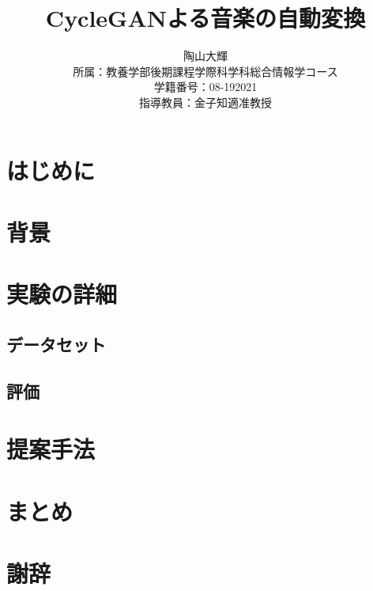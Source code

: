 \documentclass[dvipdfmx]{jreport}
\title{CycleGANよる音楽の自動変換}
\author{陶山大輝 \\
所属：教養学部後期課程学際科学科総合情報学コース\\
学籍番号：08-192021\\
指導教員：金子知適准教授\\}
\begin{document}
\maketitle


\begin{abstract}

\end{abstract}

\tableofcontents


\chapter{はじめに}


\chapter{背景}


\chapter{実験の詳細}
\section{データセット}

\section{評価}


\chapter{提案手法}


\chapter{まとめ}


\chapter*{謝辞}




\end{document}
